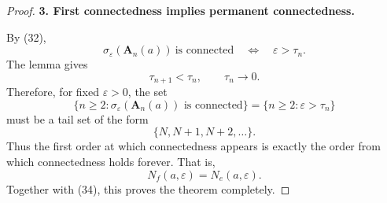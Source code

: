 \documentclass[11pt]{article}
\newcommand{\eps}{\varepsilon}
\newcommand{\A}{\mathbf A}
\begin{document}
\begin{proof}
\medskip

\noindent\textbf{3. First connectedness implies permanent connectedness.}

By (32),
\[
\sigma_\eps(\A_n(a))\ \text{is connected}
\quad\Longleftrightarrow\quad
\eps>\tau_n.
\tag{35}
\]
The lemma gives
\[
\tau_{n+1}<\tau_n,\qquad \tau_n\to0.
\tag{36}
\]
Therefore, for fixed \(\eps>0\), the set
\[
\{n\ge2:\sigma_\eps(\A_n(a))\text{ is connected}\}
=
\{n\ge2:\eps>\tau_n\}
\tag{37}
\]
must be a tail set of the form
\[
\{N,N+1,N+2,\dots\}.
\tag{38}
\]
Thus the first order at which connectedness appears is exactly the order from which connectedness holds forever. That is,
\[
N_f(a,\eps)=N_e(a,\eps).
\tag{39}
\]
Together with (34), this proves the theorem completely.
\end{proof}
\end{document}
